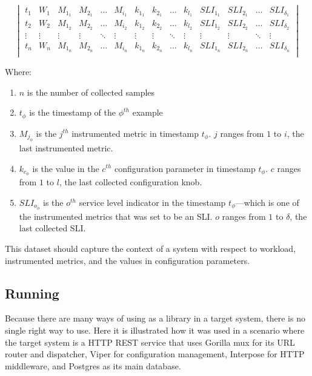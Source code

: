 $$
\begin{vmatrix}
  t_1 & W_1 & M_{1_1} & M_{2_1} & \dots & M_{i_1} & k_{1_1} & k_{2_1} & \dots & k_{l_1} & SLI_{1_1} & SLI_{2_1} & \dots & SLI_{\delta_1}\\
  t_2 & W_2 & M_{1_2} & M_{2_2} & \dots & M_{i_2} & k_{1_2} & k_{2_2} & \dots & k_{l_2} & SLI_{1_2} & SLI_{2_2} & \dots & SLI_{\delta_2}\\
  \vdots & \vdots & \vdots & \vdots & \ddots & \vdots & \vdots & \vdots & \ddots & \vdots & \vdots & \vdots & \ddots & \vdots \\
  t_n & W_n & M_{1_n} & M_{2_n} & \dots & M_{i_n} & k_{1_n} & k_{2_n} & \dots & k_{l_n} & SLI_{1_n} & SLI_{2_n} & \dots & SLI_{\delta_n}\\
\end{vmatrix}
$$

Where:

\begin{enumerate}
  \item $n$ is the number of collected samples
  \item $t_{\phi}$ is the timestamp of the $\phi^{th}$ example
  \item $M_{j_\phi}$ is the $j^{th}$ instrumented metric in timestamp $t_{\phi}$. $j$ ranges from $1$ to $i$, the last instrumented metric.
  \item $k_{c_\phi}$ is the value in the $c^{th}$ configuration parameter in timestamp $t_{\phi}$. $c$ ranges from $1$ to $l$, the last collected configuration knob.
  \item $SLI_{o_\phi}$ is the $o^{th}$ service level indicator in the timestamp $t_{\phi}$---which is one of the instrumented metrics that was set to be an SLI. $o$ ranges from $1$ to $\delta$, the last collected SLI.
\end{enumerate}

This dataset should capture the context of a system with respect to workload, instrumented metrics, and the values in configuration parameters.

\subsection{Running \projectname{}}

Because there are many ways of using \projectname{} as a library in a target system, there is no single right way to use. Here it is illustrated how it was used in a scenario where the target system is a HTTP REST service that uses Gorilla mux for its URL router and dispatcher, Viper for configuration management, Interpose for HTTP middleware, and Postgres as its main database.

